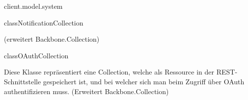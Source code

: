 \begin{texdocpackage}{client.model.system}
\begin{texdocclass}{class}{NotificationCollection}
\begin{texdocclassintro}
 (erweitert Backbone.Collection)\end{texdocclassintro}
\begin{texdocclassfields}
\end{texdocclassfields}
\begin{texdocclassconstructors}
\end{texdocclassconstructors}
\begin{texdocclassmethods}
\end{texdocclassmethods}
\end{texdocclass}


\begin{texdocclass}{class}{OAuthCollection}
\label{texdoclet:edu.kit.informatik.studyplan.client.model.system.OAuthCollection}
\begin{texdocclassintro}
Diese Klasse repräsentiert eine Collection, welche als Ressource in der
 REST-Schnittstelle gespeichert ist, und bei welcher sich man beim Zugriff
 über OAuth authentifizieren muss. (Erweitert Backbone.Collection)\end{texdocclassintro}
\begin{texdocclassfields}
\end{texdocclassfields}
\begin{texdocclassconstructors}
\end{texdocclassconstructors}
\end{texdocclass}



\end{texdocpackage}
